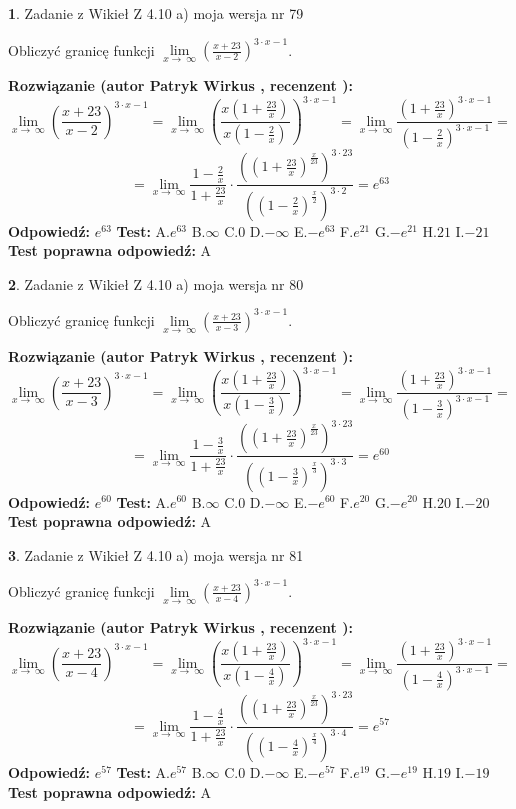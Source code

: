 \documentclass[12pt, a4paper]{article}
\theoremstyle{definition} %
\newtheorem{zad}{}
\newcommand{\zadStart}[1]{\begin{zad}#1\newline}
\newcommand{\zadStop}{\end{zad}}
\newcommand{\rozwStart}[2]{\noindent \textbf{Rozwiązanie (autor #1 , recenzent #2): }\newline}
\newcommand{\rozwStop}{\newline}
\newcommand{\odpStart}{\noindent \textbf{Odpowiedź:}\newline}
\newcommand{\odpStop}{\newline}
\newcommand{\testStart}{\noindent \textbf{Test:}\newline}
\newcommand{\testStop}{\newline}
\newcommand{\kluczStart}{\noindent \textbf{Test poprawna odpowiedź:}\newline}
\newcommand{\kluczStop}{\newline}
\begin{document}
\zadStart{Zadanie z Wikieł Z 4.10 a) moja wersja nr 79}

Obliczyć granicę funkcji  $\lim\limits_{x\to\ \infty}(\frac{x+23}{x-2})^{3\cdot x-1}$.
\zadStop
\rozwStart{Patryk Wirkus}{}
$$\lim\limits_{x\to\ \infty}(\frac{x+23}{x-2})^{3\cdot x-1} = \lim\limits_{x\to\ \infty}(\frac{x(1+\frac{23}{x})}{x(1-\frac{2}{x})})^{3\cdot x-1}=\lim\limits_{x\to\ \infty}\frac{(1+\frac{23}{x})^{3\cdot x-1}}{(1-\frac{2}{x})^{3\cdot x-1}}=$$
$$=\lim\limits_{x\to\ \infty}\frac{1-\frac{2}{x}}{1+\frac{23}{x}}\cdot\frac{((1+\frac{23}{x})^{\frac{x}{23}})^{3\cdot23}}{((1-\frac{2}{x})^{\frac{x}{2}})^{3\cdot2}}=e^{63}$$
\rozwStop
\odpStart
$e^{63}$
\odpStop
\testStart
A.$e^{63}$ B.$\infty$ C.$0$ D.$-\infty$ E.$-e^{63}$
F.$e^{21}$ G.$-e^{21}$
H.$21$
I.$-21$
\testStop
\kluczStart
A
\kluczStop



\zadStart{Zadanie z Wikieł Z 4.10 a) moja wersja nr 80}

Obliczyć granicę funkcji  $\lim\limits_{x\to\ \infty}(\frac{x+23}{x-3})^{3\cdot x-1}$.
\zadStop
\rozwStart{Patryk Wirkus}{}
$$\lim\limits_{x\to\ \infty}(\frac{x+23}{x-3})^{3\cdot x-1} = \lim\limits_{x\to\ \infty}(\frac{x(1+\frac{23}{x})}{x(1-\frac{3}{x})})^{3\cdot x-1}=\lim\limits_{x\to\ \infty}\frac{(1+\frac{23}{x})^{3\cdot x-1}}{(1-\frac{3}{x})^{3\cdot x-1}}=$$
$$=\lim\limits_{x\to\ \infty}\frac{1-\frac{3}{x}}{1+\frac{23}{x}}\cdot\frac{((1+\frac{23}{x})^{\frac{x}{23}})^{3\cdot23}}{((1-\frac{3}{x})^{\frac{x}{3}})^{3\cdot3}}=e^{60}$$
\rozwStop
\odpStart
$e^{60}$
\odpStop
\testStart
A.$e^{60}$ B.$\infty$ C.$0$ D.$-\infty$ E.$-e^{60}$
F.$e^{20}$ G.$-e^{20}$
H.$20$
I.$-20$
\testStop
\kluczStart
A
\kluczStop



\zadStart{Zadanie z Wikieł Z 4.10 a) moja wersja nr 81}

Obliczyć granicę funkcji  $\lim\limits_{x\to\ \infty}(\frac{x+23}{x-4})^{3\cdot x-1}$.
\zadStop
\rozwStart{Patryk Wirkus}{}
$$\lim\limits_{x\to\ \infty}(\frac{x+23}{x-4})^{3\cdot x-1} = \lim\limits_{x\to\ \infty}(\frac{x(1+\frac{23}{x})}{x(1-\frac{4}{x})})^{3\cdot x-1}=\lim\limits_{x\to\ \infty}\frac{(1+\frac{23}{x})^{3\cdot x-1}}{(1-\frac{4}{x})^{3\cdot x-1}}=$$
$$=\lim\limits_{x\to\ \infty}\frac{1-\frac{4}{x}}{1+\frac{23}{x}}\cdot\frac{((1+\frac{23}{x})^{\frac{x}{23}})^{3\cdot23}}{((1-\frac{4}{x})^{\frac{x}{4}})^{3\cdot4}}=e^{57}$$
\rozwStop
\odpStart
$e^{57}$
\odpStop
\testStart
A.$e^{57}$ B.$\infty$ C.$0$ D.$-\infty$ E.$-e^{57}$
F.$e^{19}$ G.$-e^{19}$
H.$19$
I.$-19$
\testStop
\kluczStart
A
\kluczStop
\end{document}
